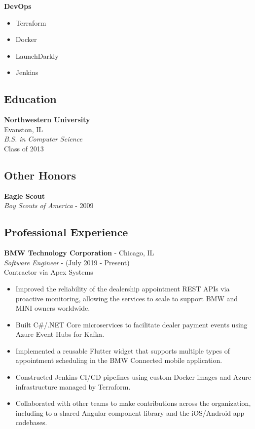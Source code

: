 \documentclass[12pt]{article}
\begin{document}
\begin{paracol}{2}
\noindent \textbf{DevOps}
\begin{itemize}
    \setlength\itemsep{0em}
    \item {\footnotesize{Terraform}}
    \item {\footnotesize{Docker}}
    \item {\footnotesize{LaunchDarkly}}
    \item {\footnotesize{Jenkins}}
\end{itemize}

\subsection*{Education}
\textbf{Northwestern University} \\ Evanston, IL \\
\textit{B.S. in Computer Science}  \\
{\footnotesize{Class of 2013}}

\subsection*{Other Honors}
\textbf{Eagle Scout} \\
\textit{Boy Scouts of America} - {\footnotesize{2009}}

\switchcolumn 

\subsection*{Professional Experience} 

\textbf{BMW Technology Corporation} - Chicago, IL \\
\textit{Software Engineer} - {\footnotesize{(July 2019 - Present)}} \\
{\footnotesize{Contractor via Apex Systems}} 
\begin{itemize}[leftmargin=*]
    \setlength\itemsep{0em}
    \item{\footnotesize{Improved the reliability of the dealership appointment REST APIs via proactive monitoring, allowing the services to scale to support BMW and MINI owners worldwide.}}
    \item {\footnotesize{Built C\#/.NET Core microservices to facilitate dealer payment events using Azure Event Hubs for Kafka.}}
    \item {\footnotesize{Implemented a reusable Flutter widget that supports multiple types of appointment scheduling in the BMW Connected mobile application.}}
    \item {\footnotesize{Constructed Jenkins CI/CD pipelines using custom Docker images and Azure infrastructure managed by Terraform.}}
    \item {\footnotesize{Collaborated with other teams to make contributions across the organization, including to a shared Angular component library and the iOS/Android app codebases.}}
\end{itemize} 



\end{paracol}
\end{document}
